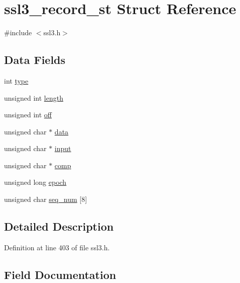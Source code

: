 \hypertarget{structssl3__record__st}{}\section{ssl3\+\_\+record\+\_\+st Struct Reference}
\label{structssl3__record__st}


{\ttfamily \#include $<$ssl3.\+h$>$}

\subsection*{Data Fields}
\begin{DoxyCompactItemize}
\item 
int \hyperlink{structssl3__record__st_ac765329451135abec74c45e1897abf26}{type}
\item 
unsigned int \hyperlink{structssl3__record__st_ac8d42bcd4a44e078047ccd7291059238}{length}
\item 
unsigned int \hyperlink{structssl3__record__st_ab1074bd163ceaf9431cc81b91ec83258}{off}
\item 
unsigned char $\ast$ \hyperlink{structssl3__record__st_a6f0f3eff16962881999799f7b0f66a0a}{data}
\item 
unsigned char $\ast$ \hyperlink{structssl3__record__st_a97758498d08f9057ee49e80fcc634954}{input}
\item 
unsigned char $\ast$ \hyperlink{structssl3__record__st_ade85d0d731495b9358cce85cd3fcef30}{comp}
\item 
unsigned long \hyperlink{structssl3__record__st_aa9d2cadf47d8209c657a3e128a17bf44}{epoch}
\item 
unsigned char \hyperlink{structssl3__record__st_ae44e46abeae23c5ff7dcdcc8d1db6d8a}{seq\+\_\+num} \mbox{[}8\mbox{]}
\end{DoxyCompactItemize}


\subsection{Detailed Description}


Definition at line 403 of file ssl3.\+h.



\subsection{Field Documentation}
